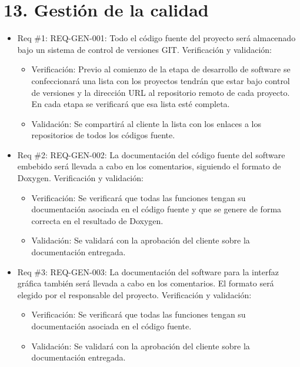 \documentclass[11pt]{charter}
\begin{document}
\section{13. Gestión de la calidad}
\label{sec:calidad}

\begin{itemize} 
\item Req \#1: REQ-GEN-001: Todo el código fuente del proyecto será almacenado bajo un
sistema de control de versiones GIT.
Verificación y validación:
\begin{itemize}
\item Verificación: Previo al comienzo de la etapa de desarrollo de software se confeccionará una lista con los proyectos tendrán que estar bajo control de versiones y la dirección URL al repositorio remoto de cada proyecto. En cada etapa se verificará que esa lista esté completa.
\item Validación: Se compartirá al cliente la lista con los enlaces a los repositorios de todos los códigos fuente.
\end{itemize}
\end{itemize}

\begin{itemize} 
\item Req \#2: REQ-GEN-002: La documentación del código fuente del software embebido será
llevada a cabo en los comentarios, siguiendo el formato de Doxygen.
Verificación y validación:
\begin{itemize}
\item Verificación: Se verificará que todas las funciones tengan su documentación asociada en el código fuente y que se genere de forma correcta en el resultado de Doxygen.
\item Validación: Se validará con la aprobación del cliente sobre la documentación entregada.
\end{itemize}
\end{itemize}

\begin{itemize} 
\item Req \#3: REQ-GEN-003: La documentación del software para la interfaz gráfica también
será llevada a cabo en los comentarios. El formato será elegido por el responsable del
proyecto.
Verificación y validación:
\begin{itemize}
\item Verificación: Se verificará que todas las funciones tengan su documentación asociada en el código fuente.
\item Validación: Se validará con la aprobación del cliente sobre la documentación entregada.
\end{itemize}
\end{itemize}
\end{document}
